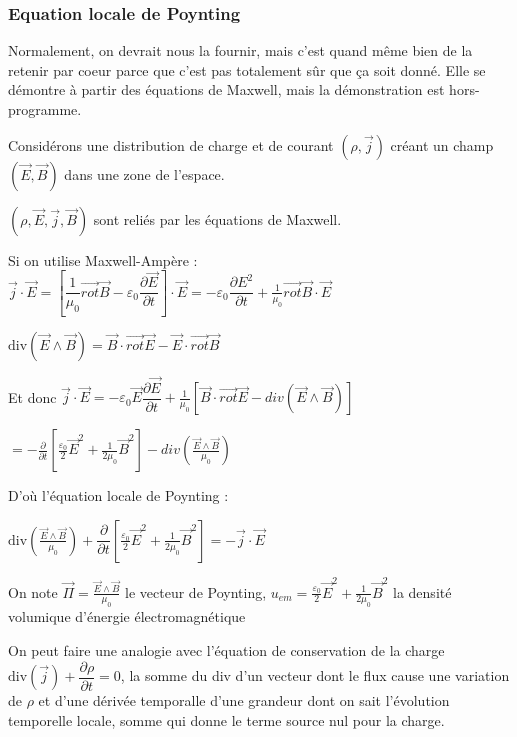 \documentclass[a4paper,12pt]{book}
\begin{document}
\subsubsection{Equation locale de Poynting}
Normalement, on devrait nous la fournir, mais c'est quand même bien de la retenir par coeur parce que c'est pas totalement sûr que ça soit donné. Elle se démontre à partir des équations de Maxwell, mais la démonstration est hors-programme.
\par Considérons une distribution de charge et de courant $(\rho,\vec{j})$ créant un champ $(\vec{E},\vec{B})$ dans  une zone de l'espace. \par $(\rho, \vec{E}, \vec{j},\vec{B})$ sont reliés par les équations de Maxwell.
\par Si on utilise Maxwell-Ampère : $\vec{j}\cdot\vec{E} = \left[\dfrac{1}{\mu_0}\vec{rot}\vec{B}-\varepsilon_0\dfrac{\partial \vec{E}}{\partial t}\right]\cdot\vec{E} = -\varepsilon_0\dfrac{\partial E^2}{\partial t} + \frac{1}{\mu_0}\vec{rot}\vec{B}\cdot\vec{E}$
\par $\mathrm{div}(\vec{E}\wedge\vec{B}) = \vec{B}\cdot\vec{rot}\vec{E} - \vec{E}\cdot\vec{rot}\vec{B}$ \par Et donc $\vec{j}\cdot\vec{E}=-\varepsilon_0\vec{E}\dfrac{\partial \vec{E}}{\partial t} + \frac{1}{\mu_0}\left[\vec{B}\cdot\vec{rot}\vec{E}-div(\vec{E}\wedge\vec{B})\right]$ \par $=-\frac{\partial}{\partial t}\left[\frac{\varepsilon_0}{2}\vec{E}^2 + \frac{1}{2\mu_0}\vec{B}^2\right] -div\left(\frac{\vec{E}\wedge\vec{B}}{\mu_0}\right)$
\par D'où l'équation locale de Poynting : \par $\mathrm{div}\left(\frac{\vec{E}\wedge\vec{B}}{\mu_0}\right) + \dfrac{\partial}{\partial t}\left[\frac{\varepsilon_0}{2}\vec{E}^2+\frac{1}{2\mu_0}\vec{B}^2\right]=-\vec{j}\cdot\vec{E}$
\par On note $\vec{\Pi} = \frac{\vec{E}\wedge\vec{B}}{\mu_0}$ le vecteur de Poynting, $u_{em} = \frac{\varepsilon_0}{2}\vec{E}^2 + \frac{1}{2\mu_0}\vec{B}^2$ la densité volumique d'énergie électromagnétique 
\par On peut faire une analogie avec l'équation de conservation de la charge $\mathrm{div}(\vec{j}) + \dfrac{\partial\rho}{\partial t}=0$, la somme du div d'un vecteur dont le flux cause une variation de $\rho$ et d'une dérivée temporalle d'une grandeur dont on sait l'évolution temporelle locale, somme qui donne le terme source nul pour la charge.
\end{document}
